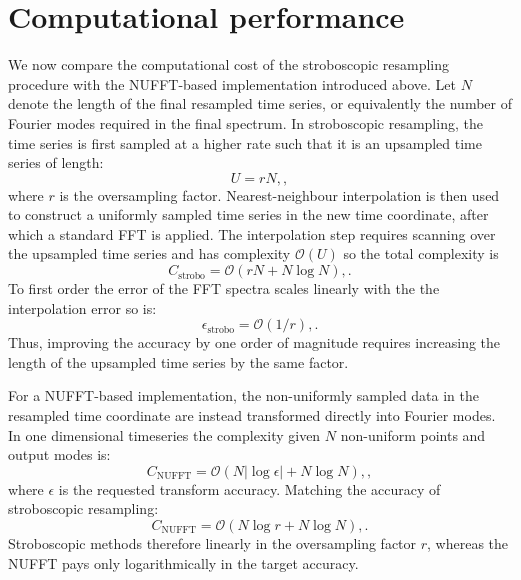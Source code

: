 \documentclass[aps,prd,amsmath,floats,floatfix, twocolumn,
superscriptaddress,nofootinbib,showpacs]{revtex4-2}
\begin{document}
\section{Computational performance}
We now compare the computational cost of the stroboscopic resampling procedure with the NUFFT-based implementation introduced above. Let $N$ denote the length of the final resampled time series, or equivalently the number of Fourier modes required in the final spectrum. In stroboscopic resampling, the time series is first sampled at a higher rate such that it is an upsampled time series of length:
\begin{equation}
U = rN , ,
\end{equation}
where $r$ is the oversampling factor. Nearest-neighbour interpolation is then used to construct a uniformly sampled time series in the new time coordinate, after which a standard FFT is applied. The interpolation step requires scanning over the upsampled time series and has complexity $\mathcal{O}(U)$ so the total complexity is
\begin{equation}
C_\text{strobo} = \mathcal{O}(rN + N\log N) , .
\end{equation}
To first order the error of the FFT spectra scales linearly with the the interpolation error so is:
\begin{equation}
\epsilon_\text{strobo} = \mathcal{O}(1/r) , .
\end{equation}
Thus, improving the accuracy by one order of magnitude requires increasing the length of the upsampled time series by the same factor.

For a NUFFT-based implementation, the non-uniformly sampled data in the resampled time coordinate are instead transformed directly into Fourier modes. In one dimensional timeseries the complexity given $N$ non-uniform points and output modes is:
\begin{equation}
C_\text{NUFFT} = \mathcal{O}\left(N|\log \epsilon| + N\log N\right) , ,
\end{equation}
where $\epsilon$ is the requested transform accuracy. Matching the accuracy of stroboscopic resampling:
\begin{equation}
C_\text{NUFFT} = \mathcal{O}\left(N\log r + N\log N\right) , .
\end{equation}
Stroboscopic methods therefore linearly in the oversampling factor $r$, whereas the NUFFT pays only logarithmically in the target accuracy.
\end{document}

